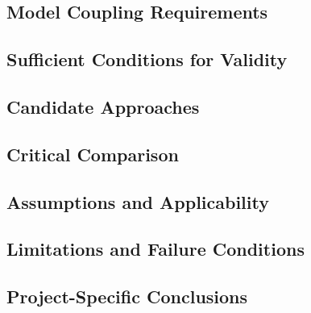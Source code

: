 
\subsection{Model Coupling Requirements}
\label{sec:res-mod-lrg-model-coupling-requirements}


\subsection{Sufficient Conditions for Validity}
\label{sec:res-mod-lrg-sufficient-conditions-validity}


\subsection{Candidate Approaches}
\label{sec:res-mod-lrg-candidate-approaches}


\subsection{Critical Comparison}
\label{sec:res-mod-lrg-critical-comparison}


\subsection{Assumptions and Applicability}
\label{sec:res-mod-lrg-assumptions}


\subsection{Limitations and Failure Conditions}
\label{sec:res-mod-lrg-limitations}


\subsection{Project-Specific Conclusions}
\label{sec:res-mod-lrg-conclusions}

